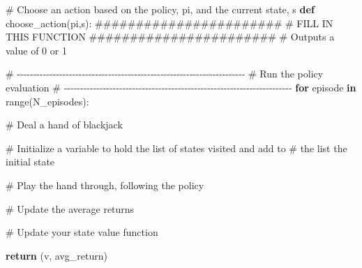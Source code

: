 \documentclass[
  letterpaper,
  DIV=11,
  numbers=noendperiod]{scrartcl}
\newenvironment{Shaded}{\begin{snugshade}}{\end{snugshade}}
\newcommand{\BuiltInTok}[1]{\textcolor[rgb]{0.00,0.23,0.31}{#1}}
\newcommand{\CommentTok}[1]{\textcolor[rgb]{0.37,0.37,0.37}{#1}}
\newcommand{\ControlFlowTok}[1]{\textcolor[rgb]{0.00,0.23,0.31}{\textbf{#1}}}
\newcommand{\KeywordTok}[1]{\textcolor[rgb]{0.00,0.23,0.31}{\textbf{#1}}}
\newcommand{\NormalTok}[1]{\textcolor[rgb]{0.00,0.23,0.31}{#1}}
\begin{document}
\begin{Shaded}
\begin{Highlighting}[]
    \CommentTok{\# Choose an action based on the policy, pi, and the current state, s}
    \KeywordTok{def}\NormalTok{ choose\_action(pi,s):}
        \CommentTok{\#\#\#\#\#\#\#\#\#\#\#\#\#\#\#\#\#\#\#\#\#\#\#}
        \CommentTok{\# FILL IN THIS FUNCTION}
        \CommentTok{\#\#\#\#\#\#\#\#\#\#\#\#\#\#\#\#\#\#\#\#\#\#\#}
        \CommentTok{\# Outputs a value of 0 or 1}
    
    \CommentTok{\# {-}{-}{-}{-}{-}{-}{-}{-}{-}{-}{-}{-}{-}{-}{-}{-}{-}{-}{-}{-}{-}{-}{-}{-}{-}{-}{-}{-}{-}{-}{-}{-}{-}{-}{-}{-}{-}{-}{-}{-}{-}{-}{-}{-}{-}{-}{-}{-}{-}{-}{-}{-}{-}{-}{-}{-}{-}{-}{-}{-}{-}{-}{-}{-}{-}{-}{-}{-}{-}{-}}
    \CommentTok{\# Run the policy evaluation   }
    \CommentTok{\# {-}{-}{-}{-}{-}{-}{-}{-}{-}{-}{-}{-}{-}{-}{-}{-}{-}{-}{-}{-}{-}{-}{-}{-}{-}{-}{-}{-}{-}{-}{-}{-}{-}{-}{-}{-}{-}{-}{-}{-}{-}{-}{-}{-}{-}{-}{-}{-}{-}{-}{-}{-}{-}{-}{-}{-}{-}{-}{-}{-}{-}{-}{-}{-}{-}{-}{-}{-}{-}{-}}
    \ControlFlowTok{for}\NormalTok{ episode }\KeywordTok{in} \BuiltInTok{range}\NormalTok{(N\_episodes):}
           
        \CommentTok{\# Deal a hand of blackjack}
    
        \CommentTok{\# Initialize a variable to hold the list of states visited and add to }
        \CommentTok{\#  the list the initial state}
        
        \CommentTok{\# Play the hand through, following the policy}
        
        \CommentTok{\# Update the average returns}

        \CommentTok{\# Update your state value function}

    \ControlFlowTok{return}\NormalTok{ (v, avg\_return)}
\end{Highlighting}
\end{Shaded}
\end{document}
